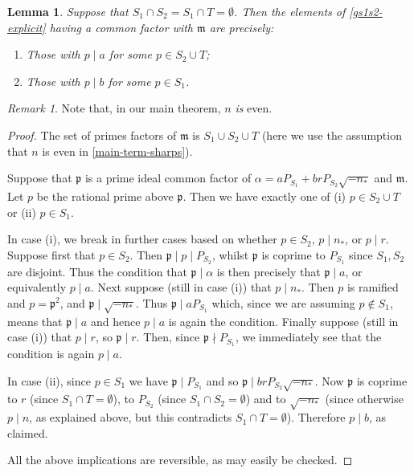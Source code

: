 \documentclass[11pt,reqno]{amsart}
\numberwithin{equation}{section}
\newtheorem{lemma}[theorem]{Lemma}
\theoremstyle{definition}
\theoremstyle{remark}
\newtheorem*{remark}{Remark}
\newcommand{\mf}{\mathfrak}
\begin{document}
\begin{lemma}
Suppose that $S_1 \cap S_2 = S_1 \cap T = \emptyset$. Then the elements of \cref{gs1s2-explicit} having a common factor with $\mf{m}$ are precisely:
\begin{enumerate}
\item Those with $p \mid a$ for some $p \in S_2 \cup T$;
\item Those with $p \mid b$ for some $p \in S_1$.
\end{enumerate}
\end{lemma}
\begin{remark}
Note that, in our main theorem, $n$ \emph{is} even. 
\end{remark}
\begin{proof}
The set of primes factors of $\mf{m}$ is $S_1 \cup S_2 \cup T$ (here we use the assumption that $n$ is even in \cref{main-term-sharps}).

Suppose that $\mf{p}$ is a prime ideal common factor of $\alpha = aP_{S_1} + br P_{S_2} \sqrt{-n_*}$ and $\mf{m}$. Let $p$ be the rational prime above $\mf{p}$. Then we have exactly one of (i) $p \in S_2 \cup T$ or  (ii) $p \in S_1$. 

In case (i), we break in further cases based on whether $p\in S_2$, $p \mid n_{\ast}$, or $p \mid r$. Suppose first that $p \in S_2$. Then $\mf{p} \mid p \mid P_{S_2}$, whilst $\mf{p}$ is coprime to $P_{S_1}$ since $S_1, S_2$ are disjoint. Thus the condition that $\mf{p} \mid \alpha$ is then precisely that $\mf{p} \mid a$, or equivalently $p \mid a$. Next suppose (still in case (i)) that $p \mid n_*$. Then $p$ is ramified and $p = \mf{p}^2$, and $\mf{p} \mid \sqrt{-n_*}$. Thus $\mf{p} \mid a P_{S_1}$ which, since we are assuming $p \notin S_1$, means that $\mf{p} \mid a$ and hence $p \mid a$ is again the condition.
Finally suppose (still in case (i)) that $p \mid r$, so $\mf{p} \mid r$. Then, since $\mf{p} \nmid P_{S_1}$, we immediately see that the condition is again $p \mid a$.

In case (ii), since $p \in S_1$ we have $\mf{p} \mid P_{S_1}$ and so $\mf{p} \mid br P_{S_2}\sqrt{-n_*}$. Now $\mf{p}$ is coprime to $r$ (since $S_1 \cap T = \emptyset$), to $P_{S_2}$ (since $S_1 \cap S_2 = \emptyset$) and to $\sqrt{-n_*}$ (since otherwise $p \mid n$, as explained above, but this contradicts $S_1 \cap T = \emptyset$).
Therefore $p \mid b$, as claimed.

All the above implications are reversible, as may easily be checked.
\end{proof}
\end{document}
